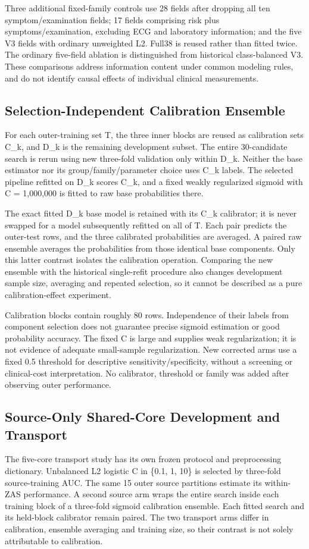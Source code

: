 \documentclass[conference]{IEEEtran}
\begin{document}
Three additional fixed-family controls use 28 fields after dropping all ten symptom/examination fields; 17 fields comprising risk plus symptoms/examination, excluding ECG and laboratory information; and the five V3 fields with ordinary unweighted L2. Full38 is reused rather than fitted twice. The ordinary five-field ablation is distinguished from historical class-balanced V3. These comparisons address information content under common modeling rules, and do not identify causal effects of individual clinical measurements.

\subsection{Selection-Independent Calibration Ensemble}
For each outer-training set T, the three inner blocks are reused as calibration sets C\_k, and D\_k is the remaining development subset. The entire 30-candidate search is rerun using new three-fold validation only within D\_k. Neither the base estimator nor its group/family/parameter choice uses C\_k labels. The selected pipeline refitted on D\_k scores C\_k, and a fixed weakly regularized sigmoid with C = 1,000,000 is fitted to raw base probabilities there.

The exact fitted D\_k base model is retained with its C\_k calibrator; it is never swapped for a model subsequently refitted on all of T. Each pair predicts the outer-test rows, and the three calibrated probabilities are averaged. A paired raw ensemble averages the probabilities from those identical base components. Only this latter contrast isolates the calibration operation. Comparing the new ensemble with the historical single-refit procedure also changes development sample size, averaging and repeated selection, so it cannot be described as a pure calibration-effect experiment.

Calibration blocks contain roughly 80 rows. Independence of their labels from component selection does not guarantee precise sigmoid estimation or good probability accuracy. The fixed C is large and supplies weak regularization; it is not evidence of adequate small-sample regularization. New corrected arms use a fixed 0.5 threshold for descriptive sensitivity/specificity, without a screening or clinical-cost interpretation. No calibrator, threshold or family was added after observing outer performance.


\subsection{Source-Only Shared-Core Development and Transport}
The five-core transport study has its own frozen protocol and preprocessing dictionary. Unbalanced L2 logistic C in \{0.1, 1, 10\} is selected by three-fold source-training AUC. The same 15 outer source partitions estimate its within-ZAS performance. A second source arm wraps the entire search inside each training block of a three-fold sigmoid calibration ensemble. Each fitted search and its held-block calibrator remain paired. The two transport arms differ in calibration, ensemble averaging and training size, so their contrast is not solely attributable to calibration.
\end{document}
